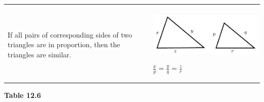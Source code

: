 \begin{center}
\begin{xtabular*}{\mytablewidth}[t]{|p{10\mystarwidth}|p{10\mystarwidth}|}
\begin{center}
      \vspace{2pt}
    \vspace{.1in}
    
    \end{center}



    \addtocounter{footnote}{-0}
    
     \tabularnewline{}
    
    
        If all pairs of corresponding sides of two triangles are in proportion, then the triangles are similar. &
    
    
        
                    
    \setcounter{subfigure}{0}

\label{m39368*id318279}
    \begin{center}
    \label{m39368*id318279!!!underscore!!!media}\label{m39368*id318279!!!underscore!!!printimage}\includegraphics[width=.25\columnwidth]{col11306.imgs/m39368_MG10C13_036.png} %
        
      \vspace{2pt}
    \vspace{.1in}
    
    \end{center}



    \addtocounter{footnote}{-0}
    
                    \begin{math}\frac{x}{p}=\frac{y}{q}=\frac{z}{r}\end{math}
     \tabularnewline{}
    \end{xtabular*}
      \end{center}
    \begin{center}{\small\bfseries Table 12.6}\end{center}
    

